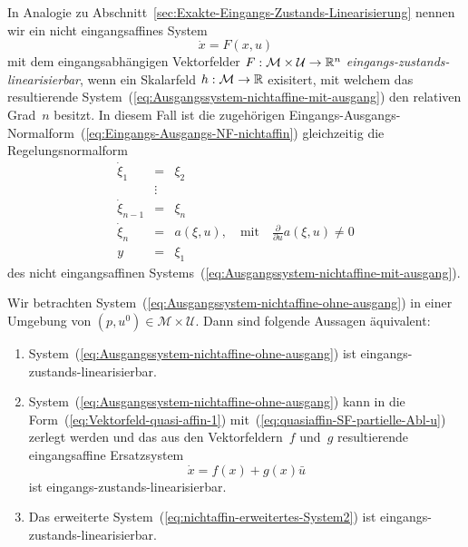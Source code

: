 In Analogie zu Abschnitt~\ref{sec:Exakte-Eingangs-Zustands-Linearisierung}
nennen wir ein nicht eingangsaffines System
\begin{equation}
\dot{x}=F(x,u)\label{eq:Ausgangssystem-nichtaffine-ohne-ausgang}
\end{equation}
mit dem eingangsabhängigen Vektorfelder $F:\mathcal{M}\times\mathcal{U}\to{\mathbb{R}}^{n}$
\emph{eingangs-zustands-linearisierbar},
wenn ein Skalarfeld $h:\mathcal{M}\to{\mathbb{R}}$ exisitert, mit welchem das
resultierende System~(\ref{eq:Ausgangssystem-nichtaffine-mit-ausgang})
den relativen Grad~$n$ besitzt. In diesem Fall ist die zugehörigen
Eingangs-Ausgangs-Normalform~(\ref{eq:Eingangs-Ausgangs-NF-nichtaffin})
gleichzeitig die Regelungsnormalform
\begin{equation}
\begin{array}{lcl}
\dot{\xi}_{1} & = & \xi_{2}\\
 & \vdots\\
\dot{\xi}_{n-1} & = & \xi_{n}\\
\dot{\xi}_{n} & = & a(\xi,u),\quad\text{mit}\quad\frac{\partial}{\partial u}a(\xi,u)\neq0\\
y & = & \xi_{1}
\end{array}\label{eq:Regelungs-NF-nichtaffin}
\end{equation}
 des nicht eingangsaffinen Systems~(\ref{eq:Ausgangssystem-nichtaffine-mit-ausgang}).

\begin{theorem}
\label{thm:EZ-Linearisierung-nichtaffin}Wir betrachten System~(\ref{eq:Ausgangssystem-nichtaffine-ohne-ausgang})
in einer Umgebung von $(p,u^{0})\in\mathcal{M}\times\mathcal{U}$.
Dann sind folgende Aussagen äquivalent:
\begin{enumerate}
\item \label{enu:EZL-nichtaffin1}System~(\ref{eq:Ausgangssystem-nichtaffine-ohne-ausgang})
ist eingangs-zustands-linearisierbar.
\item \label{enu:EZL-nichtaffin2}System~(\ref{eq:Ausgangssystem-nichtaffine-ohne-ausgang})
kann in die Form~(\ref{eq:Vektorfeld-quasi-affin-1}) mit~(\ref{eq:quasiaffin-SF-partielle-Abl-u})
zerlegt werden und das aus den Vektorfeldern~$f$ und~$g$ resultierende
eingangsaffine Ersatz\-system
\begin{equation}
\dot{x}=f(x)+g(x)\bar{u}\label{eq:affines-ersatzsystem-nach-zerlegung}
\end{equation}
ist eingangs-zustands-linearisierbar.
\item \label{enu:EZL-nichtaffin3}Das erweiterte System~(\ref{eq:nichtaffin-erweitertes-System2})
ist eingangs-zustands-linearisierbar.
\end{enumerate}
\end{theorem}

